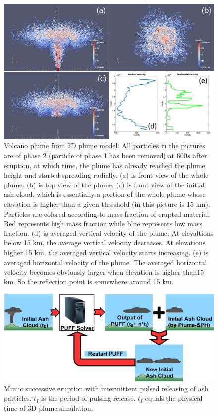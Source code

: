 \documentclass[utf8]{frontiersSCNS} %
\begin{document}
\begin{figure}[!htb]
\centering
\includegraphics[width=1.0\textwidth]{Figures/Plume-SPH-Results}
\caption{Volcano plume from 3D plume model. All particles in the pictures are of  phase 2 (particle of phase 1 has been removed) at $600s$ after eruption, at which time, the plume has already reached the plume height and started spreading radially. (a) is front view of the whole plume. (b) is top view of the plume. (c) is front view of the initial ash cloud, which is essentially a portion of the whole plume whose elevation is higher than a given threshold (in this picture is 15 km). Particles are colored according to mass fraction of erupted material. Red represents high mass fraction while blue represents low mass fraction. (d) is averaged vertical velocity of the plume. At elevaltions below 15 km, the average vertical velocity decreases. At elevations higher 15 km, the averaged vertical velocity starts increasing. (e) is averaged horizontal velocity of the plume. The averaged horizontal velocity becomes obviously larger when elevation is higher than15 km. So the reflection point is somewhere around 15 km.}
\label{fig:Plume-SPH-Pinatubo-ash-cloud}
\end{figure}

\begin{figure}
\center
\includegraphics[width=0.90 \textwidth]{Figures/Restart-Puff}
\caption{Mimic successive eruption with intermittent pulsed releasing of ash particles. $t_I$ is the period of pulsing release. $t_I$ equals the physical time of 3D plume simulation.}
\label{fig:Restart-Puff}
\end{figure}
\end{document}
